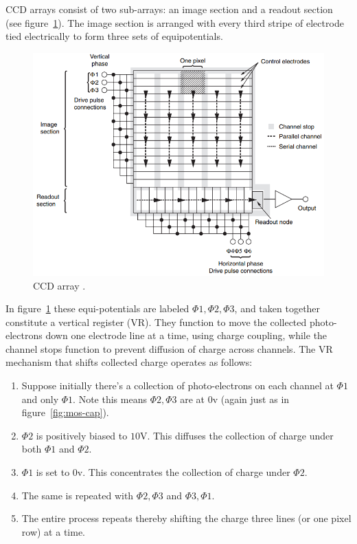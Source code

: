 CCD arrays consist of two sub-arrays: an image section and a readout section (see figure~\ref{fig:ccd-array}).
%
The image section is arranged with every third stripe of electrode tied electrically to form three sets of equipotentials.
\begin{figure}[!htbp]
	\includegraphics[width=\linewidth,keepaspectratio]{figures/background/ccd_array.png}
	\caption{CCD array \cite{pawley1995handbook}.}
	\label{fig:ccd-array}
\end{figure}
%
In figure~\ref{fig:ccd-array} these equi-potentials are labeled \(\Phi1, \Phi2, \Phi3\), and taken together constitute a vertical register (VR).
%
They function to move the collected photo-electrons down one electrode line at a time, using charge coupling, while the channel stops function to prevent diffusion of charge across channels.
%
The VR mechanism that shifts collected charge operates as follows:
\begin{framed}
\begin{enumerate}
	\item Suppose initially there's a collection of photo-electrons on each channel at \(\Phi1\) and only \(\Phi1\). Note this means \(\Phi2, \Phi3\) are at \(0\)v (again just as in figure~\ref{fig:mos-cap}).
	\item \(\Phi2\) is positively biased to \(10\)V. This diffuses the collection of charge under both \(\Phi1\) and \(\Phi2\).
	\item \(\Phi1\) is set to \(0\)v. This concentrates the collection of charge under \(\Phi2\).
	\item The same is repeated with \(\Phi2, \Phi3\) and \(\Phi3, \Phi1\).
	\item The entire process repeats thereby shifting the charge three lines (or one pixel row) at a time.
\end{enumerate}
\end{framed}
